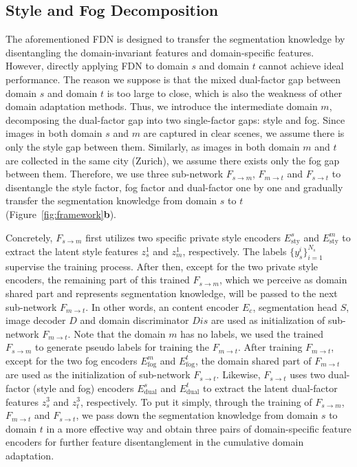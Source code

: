 \documentclass[10pt,twocolumn,letterpaper]{article}
\def\model{F}
\def\sty{\text{sty}}
\def\fog{\text{fog}}
\def\dual{\text{dual}}
\def\imd{m}
\def\td{t}
\begin{document}
\subsection{Style and Fog Decomposition}








The aforementioned FDN is designed to transfer the segmentation knowledge by disentangling the domain-invariant features and domain-specific features. 
However, directly applying FDN to domain $s$ and domain $t$ cannot achieve ideal performance.
The reason we suppose is that the mixed dual-factor gap between domain $s$ and domain $t$ is too large to close, which is also the weakness of other domain adaptation methods. 
Thus, we introduce the intermediate domain $m$, decomposing the dual-factor gap into two single-factor gaps: style and fog. Since images in both domain $s$ and $\imd$ are captured in clear scenes, we assume there is only the style gap between them. Similarly, as images in both domain $\imd$ and $\td$ are collected in the same city (Zurich), we assume there exists only the fog gap between them. Therefore, we use three sub-network $\model_{s \rightarrow \imd}$, $\model_{\imd \rightarrow \td}$ and $\model_{s \rightarrow \td}$ to disentangle the style factor, fog factor and dual-factor one by one and gradually transfer the segmentation knowledge from domain $s$ to $\td$ (Figure~\ref{fig:framework}\textbf{b}).

Concretely, $\model_{s \rightarrow \imd}$ first utilizes two specific private style encoders $E_{\sty}^{s}$ and $E_{\sty}^{\imd}$ to extract the latent style features $z_{s}^{1}$ and $z_{m}^{1}$, respectively. 
The labels $\{y_{s}^i\}_{i=1}^{N_s}$ supervise the training process.
After then, 
except for the two private style encoders, the remaining part of this trained $\model_{s \rightarrow \imd}$, which we perceive as domain shared part and represents segmentation knowledge, will be passed to the next sub-network $\model_{\imd \rightarrow \td}$. In other words, an content encoder $E_{c}$, segmentation head $S$, image decoder $D$ and domain discriminator $\mathit{Dis}$ are used as initialization of sub-network $\model_{\imd \rightarrow \td}$. Note that the domain $\imd$ has no labels, we used the trained $\model_{s \rightarrow \imd}$ to generate pseudo labels for training the $\model_{\imd \rightarrow \td}$. After training $\model_{\imd \rightarrow \td}$, except for the two fog encoders $E_{\fog}^{\imd}$ and $E_{\fog}^{\td}$, the domain shared part of  $\model_{\imd \rightarrow \td}$ are used as the initialization of sub-network $\model_{s \rightarrow \td}$. Likewise,  $\model_{s \rightarrow \td}$ uses two dual-factor (style and fog) encoders $E_{\dual}^{s}$ and $E_{\dual}^{\td}$ to extract the latent dual-factor features $z_{s}^{3}$ and $z_{t}^{3}$, respectively. 
To put it simply, through the training of $\model_{s \rightarrow \imd}$, $\model_{\imd \rightarrow \td}$ and $\model_{s \rightarrow \td}$, we pass down the segmentation knowledge from domain $s$ to domain $\td$ in a more effective way and obtain three pairs of domain-specific feature encoders for further feature disentanglement in the cumulative domain adaptation.
\end{document}
